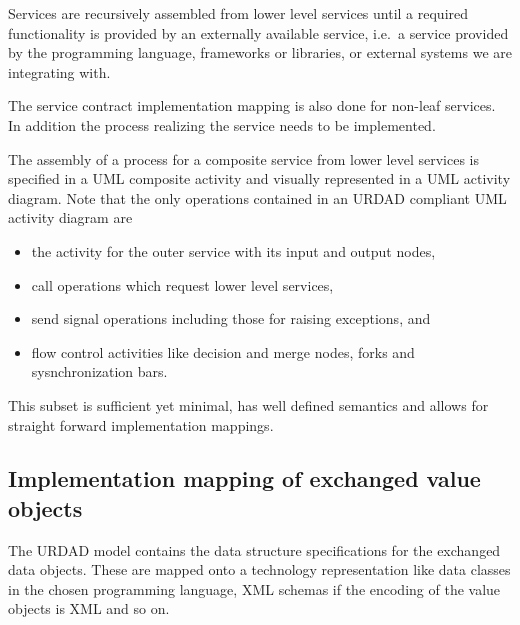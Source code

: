 Services are recursively assembled from lower level services until a required functionality is provided by
an externally available service, i.e.\  a service provided by the programming language, frameworks or libraries,
or external systems we are integrating with.

The service contract implementation mapping is also done for non-leaf services. In addition the process
realizing the service needs to be implemented.

The assembly of a process for a composite service from lower level services is specified in a UML composite 
activity  and visually represented in a UML activity diagram. Note that the only operations contained in an URDAD
compliant UML activity diagram are
\begin{itemize}
  \item the activity for the outer service with its input and output nodes,
  \item call operations which request lower level services,
  \item send signal operations including those for raising exceptions, and
  \item flow control activities like decision and merge nodes, forks and sysnchronization bars.
\end{itemize}

This subset is sufficient yet minimal, has well defined semantics and allows for straight forward implementation 
mappings.


\subsection{Implementation mapping of exchanged value objects}

The URDAD model contains the data structure specifications for the exchanged data objects. These
are mapped onto a technology representation like data classes in the chosen programming language, 
XML schemas if the encoding of the value objects is XML and so on.

